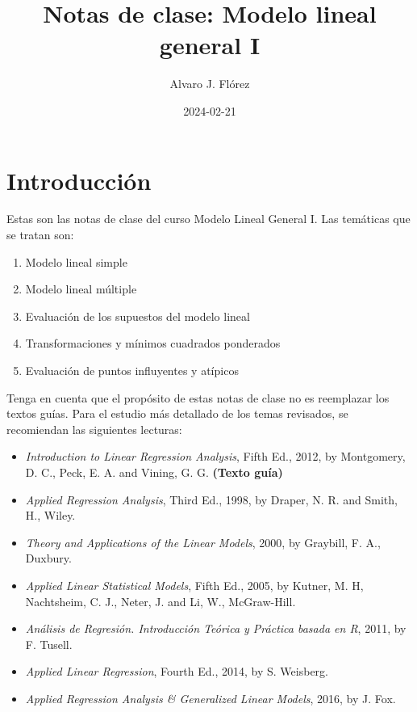 \documentclass[
]{article}
\title{Notas de clase: Modelo lineal general I}
\author{Alvaro J. Flórez}
\date{2024-02-21}
\providecommand{\tightlist}{%
  \setlength{\itemsep}{0pt}\setlength{\parskip}{0pt}}
\begin{document}
\maketitle

{
\setcounter{tocdepth}{2}
\tableofcontents
}
\hypertarget{introducciuxf3n}{%
\section*{Introducción}\label{introducciuxf3n}}

Estas son las notas de clase del curso Modelo Lineal General I. Las temáticas que se tratan son:

\begin{enumerate}
\def\labelenumi{\arabic{enumi}.}
\tightlist
\item
  Modelo lineal simple
\item
  Modelo lineal múltiple
\item
  Evaluación de los supuestos del modelo lineal
\item
  Transformaciones y mínimos cuadrados ponderados
\item
  Evaluación de puntos influyentes y atípicos
\end{enumerate}

Tenga en cuenta que el propósito de estas notas de clase no es reemplazar los textos guías. Para el estudio más detallado de los temas revisados, se recomiendan las siguientes lecturas:

\begin{itemize}
\tightlist
\item
  \emph{Introduction to Linear Regression Analysis}, Fifth Ed., 2012, by Montgomery, D. C., Peck, E. A. and Vining, G. G. \textbf{(Texto guía)}
\item
  \emph{Applied Regression Analysis}, Third Ed., 1998, by Draper, N. R. and Smith, H., Wiley.
\item
  \emph{Theory and Applications of the Linear Models}, 2000, by Graybill, F. A., Duxbury.
\item
  \emph{Applied Linear Statistical Models}, Fifth Ed., 2005, by Kutner, M. H, Nachtsheim, C. J., Neter, J. and Li, W., McGraw-Hill.
\item
  \emph{Análisis de Regresión. Introducción Teórica y Práctica basada en R}, 2011, by F. Tusell.
\item
  \emph{Applied Linear Regression}, Fourth Ed., 2014, by S. Weisberg.
\item
  \emph{Applied Regression Analysis \& Generalized Linear Models}, 2016, by J. Fox.
\end{itemize}
\end{document}
